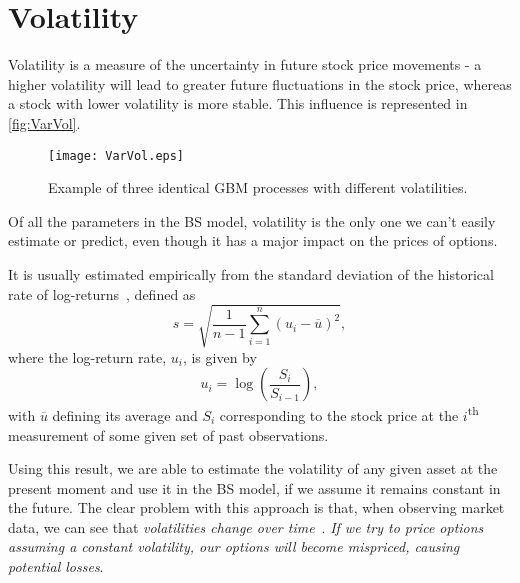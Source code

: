 
\section{Volatility}
\label{sec:vol}
Volatility is a measure of the uncertainty in future stock price movements - a higher volatility will lead to greater future fluctuations in the stock price, whereas a stock with lower volatility is more stable. This influence is represented in \autoref{fig:VarVol}.
\begin{figure}[H]
    \centering
      \texttt{[image: VarVol.eps]}
      \caption{Example of three identical GBM processes with different volatilities.}\label{fig:VarVol}
    \end{figure}
    
Of all the parameters in the BS model, volatility is the only one we can't easily estimate or predict, even though it has a major impact on the prices of options.

It is usually estimated empirically from the standard deviation of the historical rate of log-returns~\citep{Hull}, defined as
\begin{equation}
s=\sqrt{\frac{1}{n-1}\sum_{i=1}^n(u_i-\overline{u})^2},
\end{equation}
\noindent where the log-return rate, $u_i$, is given by
\begin{equation}
u_i=\log\left(\frac{S_i}{S_{i-1}}\right),
\end{equation}
\noindent with $\overline{u}$ defining its average and $S_i$ corresponding to the stock price at the $i$\textsuperscript{th} measurement of some given set of past observations.


Using this result, we are able to estimate the volatility of any given asset at the present moment and use it in the BS model, if we assume it remains constant in the future. The clear problem with this approach is that, when observing market data, we can see that \emph{volatilities change over time}~\citep{chourdakis}. \emph{If we try to price options assuming a constant volatility, our options will become mispriced, causing potential losses}.

